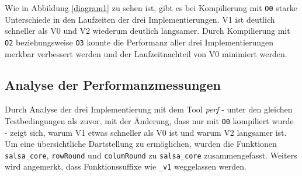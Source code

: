 \documentclass[course=erap]{aspdoc}
\begin{document}
\begin{center}
\label{diagram1}
\end{center}
Wie in Abbildung \ref{diagram1} zu sehen ist, gibt es bei Kompilierung mit \texttt{O0} starke
Unterschiede in den Laufzeiten der drei Implementierungen. V1 ist deutlich schneller als V0 
und V2 wiederum deutlich langsamer. Durch Kompilierung mit \texttt{O2} beziehungsweise \texttt{O3}
konnte die Performanz aller drei Implementierungen merkbar verbessert werden und der Laufzeitnachteil
von V0 minimiert werden.

\subsection{Analyse der Performanzmessungen}
Durch Analyse der drei Implementierung mit dem Tool \emph{perf} - unter 
den gleichen Testbedingungen als zuvor, mit der Änderung, dass nur mit \texttt{O0} kompiliert wurde 
- zeigt sich, warum V1 etwas schneller als V0 ist und warum V2 langsamer ist.
Um eine übersichtliche Dartstellung zu ermöglichen, wurden die Funktionen \texttt{salsa\_core},
\texttt{rowRound} und \texttt{columRound} zu \texttt{salsa\_core} zusammengefasst. Weiters wird angemerkt, dass
Funktionssuffixe wie \texttt{\_v1} weggelassen werden.
\end{document}
